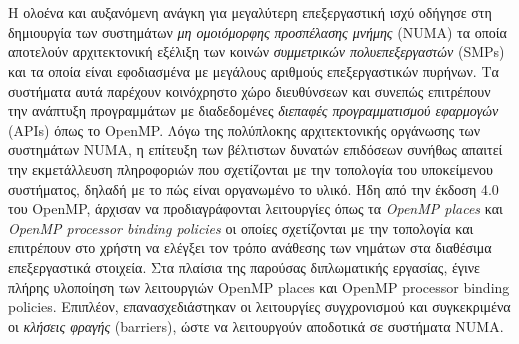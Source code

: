 \chapter*{\abstractname}
\addstarredchapter{\abstractname} %
\makecseabstract

\noindent Η ολοένα και αυξανόμενη ανάγκη για μεγαλύτερη επεξεργαστική ισχύ οδήγησε στη δημιουργία των συστημάτων \textit{μη ομοιόμορφης προσπέλασης μνήμης} (NUMA) τα οποία αποτελούν αρχιτεκτονική εξέλιξη των κοινών \textit{συμμετρικών πολυεπεξεργαστών} (SMPs) και τα οποία είναι εφοδιασμένα με μεγάλους αριθμούς επεξεργαστικών πυρήνων. Τα συστήματα αυτά παρέχουν κοινόχρηστο χώρο διευθύνσεων και συνεπώς επιτρέπουν την ανάπτυξη προγραμμάτων με διαδεδομένες \textit{διεπαφές προγραμματισμού εφαρμογών} (APIs) όπως το OpenMP. Λόγω της πολύπλοκης αρχιτεκτονικής οργάνωσης των συστημάτων NUMA, η επίτευξη των βέλτιστων δυνατών επιδόσεων συνήθως απαιτεί την εκμετάλλευση πληροφοριών που σχετίζονται με την τοπολογία του υποκείμενου συστήματος, δηλαδή με το πώς είναι οργανωμένο το υλικό. Ήδη από την έκδοση 4.0 του OpenMP, άρχισαν να προδιαγράφονται λειτουργίες όπως τα \textit{OpenMP places} και \textit{OpenMP processor binding policies} οι οποίες σχετίζονται με την τοπολογία και επιτρέπουν στο χρήστη να ελέγξει τον τρόπο ανάθεσης των νημάτων στα διαθέσιμα επεξεργαστικά στοιχεία. Στα πλαίσια της παρούσας διπλωματικής εργασίας, έγινε πλήρης υλοποίηση των λειτουργιών OpenMP places και OpenMP processor binding policies. Επιπλέον, επανασχεδιάστηκαν οι λειτουργίες συγχρονισμού και συγκεκριμένα οι \textit{κλήσεις φραγής} (barriers), ώστε να λειτουργούν αποδοτικά σε συστήματα NUMA.

\bigskip